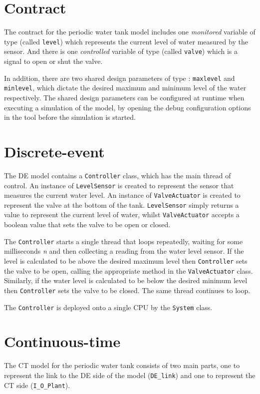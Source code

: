 \section{Contract}
The contract for the periodic water tank model includes one
\emph{monitored} variable of type  (called \texttt{level})
which represents the current level of water measured by the sensor.
And there is one \emph{controlled} variable of type 
(called \texttt{valve}) which is a signal to open or shut the valve.

In addition, there are two shared design parameters of type
: \texttt{maxlevel} and \texttt{minlevel}, which dictate
the desired maximum and minimum level of the water respectively.  The
shared design parameters can be configured at runtime when executing a
simulation of the model, by opening the debug configuration options in
the \DESTECS tool before the simulation is started.

\section{Discrete-event}
The DE model contains a \texttt{Controller} class, which has the main
thread of control.  An instance of \texttt{LevelSensor} is created to
represent the sensor that measures the current water level.  An
instance of \texttt{ValveActuator} is created to represent the valve
at the bottom of the tank.  \texttt{LevelSensor} simply returns a
value to represent the current level of water, whilst
\texttt{Valve\-Ac\-tu\-a\-tor} accepts a boolean value that sets the valve to
be open or closed.

The \texttt{Controller} starts a single thread that loops repeatedly,
waiting for some milliseconds \emph{n} and then collecting a reading
from the water level sensor.  If the level is calculated to be above
the desired maximum level then \texttt{Controller} sets the valve to
be open, calling the appropriate method in the \texttt{ValveActuator}
class.  Similarly, if the water level is calculated to be below the
desired minimum level then \texttt{Controller} sets the valve to be
closed.  The same thread continues to loop.

The \texttt{Controller} is deployed onto a single CPU
by the \texttt{System} class.

\section{Continuous-time}
The CT model for the periodic water tank consists of two main parts,
one to represent the link to the DE side of the model (\texttt{DE\_link})
and one to represent the CT side (\texttt{I\_O\_Plant}).

